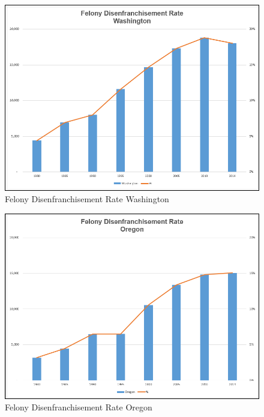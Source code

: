 \begin{figure}[H]
	\centering
	\includegraphics[width=\maxwidth{.95\linewidth}]{gfx/ch04_fig57}
	\caption{Felony Disenfranchisement Rate Washington}
	\label{04:fig57}
\end{figure}

\begin{figure}[H]
	\centering
	\includegraphics[width=\maxwidth{.95\linewidth}]{gfx/ch04_fig58}
	\caption{Felony Disenfranchisement Rate Oregon}
	\label{04:fig58}
\end{figure}

